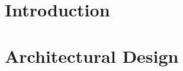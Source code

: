 \documentclass{config/PoliMi3i_thesis}
\begin{document}
\startpreamble
\setcounter{page}{1} %


\thispagestyle{empty}
\tableofcontents %
\thispagestyle{empty}
\cleardoublepage

%
%
%    
%

\mainmatter %

\chapter{Introduction}


\chapter{Architectural Design}

\end{document}
